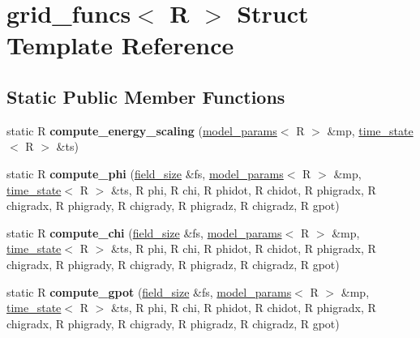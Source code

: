 \hypertarget{structgrid__funcs}{
\section{grid\_\-funcs$<$ R $>$ Struct Template Reference}
\label{structgrid__funcs}
}
\subsection*{Static Public Member Functions}
\begin{DoxyCompactItemize}
\item 
\hypertarget{structgrid__funcs_ae3db013f110ad8e23b38207a7e3c88c5}{
static R {\bfseries compute\_\-energy\_\-scaling} (\hyperlink{structmodel__params}{model\_\-params}$<$ R $>$ \&mp, \hyperlink{structtime__state}{time\_\-state}$<$ R $>$ \&ts)}
\label{structgrid__funcs_ae3db013f110ad8e23b38207a7e3c88c5}

\item 
\hypertarget{structgrid__funcs_ae9184a5f3f25cf912540747a6a12af5d}{
static R {\bfseries compute\_\-phi} (\hyperlink{structfield__size}{field\_\-size} \&fs, \hyperlink{structmodel__params}{model\_\-params}$<$ R $>$ \&mp, \hyperlink{structtime__state}{time\_\-state}$<$ R $>$ \&ts, R phi, R chi, R phidot, R chidot, R phigradx, R chigradx, R phigrady, R chigrady, R phigradz, R chigradz, R gpot)}
\label{structgrid__funcs_ae9184a5f3f25cf912540747a6a12af5d}

\item 
\hypertarget{structgrid__funcs_a4be6b2b34635f0b88e1ddde0107e76de}{
static R {\bfseries compute\_\-chi} (\hyperlink{structfield__size}{field\_\-size} \&fs, \hyperlink{structmodel__params}{model\_\-params}$<$ R $>$ \&mp, \hyperlink{structtime__state}{time\_\-state}$<$ R $>$ \&ts, R phi, R chi, R phidot, R chidot, R phigradx, R chigradx, R phigrady, R chigrady, R phigradz, R chigradz, R gpot)}
\label{structgrid__funcs_a4be6b2b34635f0b88e1ddde0107e76de}

\item 
\hypertarget{structgrid__funcs_acd4a897e35c94b0d9117e17657183f24}{
static R {\bfseries compute\_\-gpot} (\hyperlink{structfield__size}{field\_\-size} \&fs, \hyperlink{structmodel__params}{model\_\-params}$<$ R $>$ \&mp, \hyperlink{structtime__state}{time\_\-state}$<$ R $>$ \&ts, R phi, R chi, R phidot, R chidot, R phigradx, R chigradx, R phigrady, R chigrady, R phigradz, R chigradz, R gpot)}
\label{structgrid__funcs_acd4a897e35c94b0d9117e17657183f24}


\end{DoxyCompactItemize}
